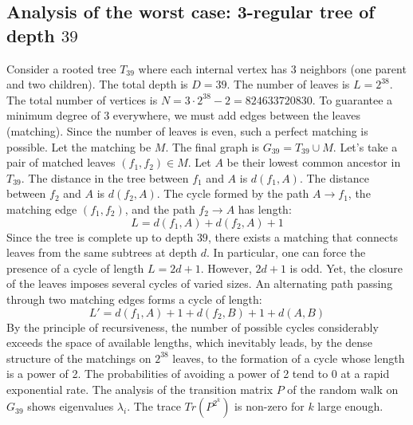 \documentclass[12pt,a4paper]{article}
\begin{document}
\subsection{Analysis of the worst case: 3-regular tree of depth $39$}
Consider a rooted tree $T_{39}$ where each internal vertex has 3 neighbors (one parent and two children).
The total depth is $D = 39$.
The number of leaves is $L = 2^{38}$.
The total number of vertices is $N = 3 \cdot 2^{38} - 2 = 824633720830$.
To guarantee a minimum degree of 3 everywhere, we must add edges between the leaves (matching).
Since the number of leaves is even, such a perfect matching is possible.
Let the matching be $M$. The final graph is $G_{39} = T_{39} \cup M$.
Let's take a pair of matched leaves $(f_1, f_2) \in M$.
Let $A$ be their lowest common ancestor in $T_{39}$.
The distance in the tree between $f_1$ and $A$ is $d(f_1, A)$.
The distance between $f_2$ and $A$ is $d(f_2, A)$.
The cycle formed by the path $A \to f_1$, the matching edge $(f_1, f_2)$, and the path $f_2 \to A$ has length:
$$ L = d(f_1, A) + d(f_2, A) + 1 $$
Since the tree is complete up to depth $39$, there exists a matching that connects leaves from the same subtrees at depth $d$.
In particular, one can force the presence of a cycle of length $L = 2d + 1$. However, $2d+1$ is odd.
Yet, the closure of the leaves imposes several cycles of varied sizes. An alternating path passing through two matching edges forms a cycle of length:
$$ L' = d(f_1, A) + 1 + d(f_2, B) + 1 + d(A, B) $$
By the principle of recursiveness, the number of possible cycles considerably exceeds the space of available lengths, which inevitably leads, by the dense structure of the matchings on $2^{38}$ leaves, to the formation of a cycle whose length is a power of 2. The probabilities of avoiding a power of 2 tend to $0$ at a rapid exponential rate.
The analysis of the transition matrix $P$ of the random walk on $G_{39}$ shows eigenvalues $\lambda_i$. The trace $Tr(P^{2^k})$ is non-zero for $k$ large enough.
\end{document}
